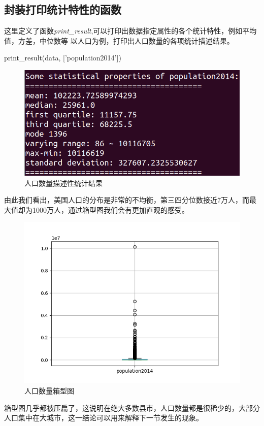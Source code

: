 \documentclass[
12pt, %
UTF8
]{fphw}
\begin{document}
	\subsection{封装打印统计特性的函数}
	这里定义了函数\emph{print\_result},可以打印出数据指定属性的各个统计特性，例如平均值，方差，中位数等
	以人口为例，打印出人口数量的各项统计描述结果。
	\begin{python}
		 print_result(data, ['population2014'])
	\end{python}
	\begin{figure}[H]
		\centering
		\includegraphics[scale = 0.7]{population.png}
		\caption{人口数量描述性统计结果}
	\end{figure}

	由此我们看出，美国人口的分布是非常的不均衡，第三四分位数接近7万人，而最大值却为1000万人，通过箱型图我们会有更加直观的感受。
	\begin{figure}[H]
		\centering
		\includegraphics[scale =0.5]{p_box.png}
		\caption{人口数量箱型图}
	\end{figure}
	箱型图几乎都被压扁了，这说明在绝大多数县市，人口数量都是很稀少的，大部分人口集中在大城市，这一结论可以用来解释下一节发生的现象。
\end{document}
